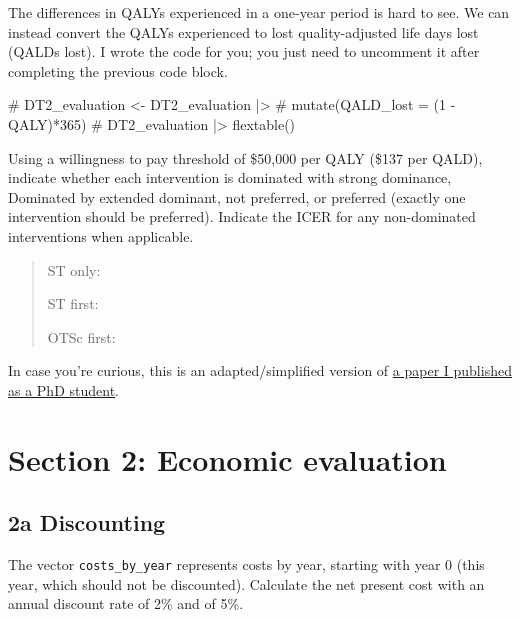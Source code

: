 \documentclass[
  letterpaper,
  DIV=11,
  numbers=noendperiod]{scrartcl}
\newenvironment{Shaded}{\begin{snugshade}}{\end{snugshade}}
\newcommand{\CommentTok}[1]{\textcolor[rgb]{0.37,0.37,0.37}{#1}}
\begin{document}
The differences in QALYs experienced in a one-year period is hard to
see. We can instead convert the QALYs experienced to lost
quality-adjusted life days lost (QALDs lost). I wrote the code for you;
you just need to uncomment it after completing the previous code block.

\begin{Shaded}
\begin{Highlighting}[]
\CommentTok{\# DT2\_evaluation \textless{}{-} DT2\_evaluation |\textgreater{}}
\CommentTok{\#   mutate(QALD\_lost = (1 {-} QALY)*365)}
\CommentTok{\# DT2\_evaluation |\textgreater{} flextable()}
\end{Highlighting}
\end{Shaded}

Using a willingness to pay threshold of \$50,000 per QALY (\$137 per
QALD), indicate whether each intervention is dominated with strong
dominance, Dominated by extended dominant, not preferred, or preferred
(exactly one intervention should be preferred). Indicate the ICER for
any non-dominated interventions when applicable.

\begin{quote}
ST only:

ST first:

OTSc first:
\end{quote}

In case you're curious, this is an adapted/simplified version of
\href{https://doi.org/10.1016/j.giec.2019.09.004}{a paper I published as
a PhD student}.

\hypertarget{section-2-economic-evaluation}{%
\section{Section 2: Economic
evaluation}\label{section-2-economic-evaluation}}

\hypertarget{a-discounting}{%
\subsection{2a Discounting}\label{a-discounting}}

The vector \texttt{costs\_by\_year} represents costs by year, starting
with year 0 (this year, which should not be discounted). Calculate the
net present cost with an annual discount rate of 2\% and of 5\%.
\end{document}
